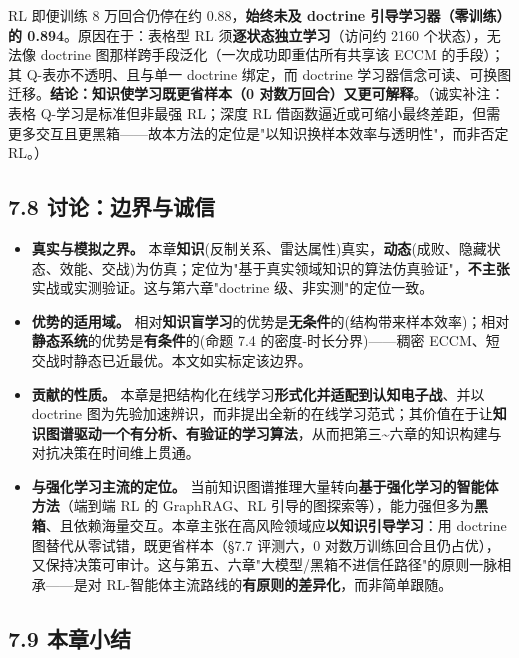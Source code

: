 \documentclass[12pt,a4paper]{ctexart}
\begin{document}
RL 即便训练 8 万回合仍停在约 0.88，\textbf{始终未及 doctrine 引导学习器（零训练）的 0.894}。原因在于：表格型 RL 须\textbf{逐状态独立学习}（访问约 2160 个状态），无法像 doctrine 图那样跨手段泛化（一次成功即重估所有共享该 ECCM 的手段）；其 Q-表亦不透明、且与单一 doctrine 绑定，而 doctrine 学习器信念可读、可换图迁移。\textbf{结论：知识使学习既更省样本（0 对数万回合）又更可解释}。（诚实补注：表格 Q-学习是标准但非最强 RL；深度 RL 借函数逼近或可缩小最终差距，但需更多交互且更黑箱——故本方法的定位是"以知识换样本效率与透明性"，而非否定 RL。）


\subsection*{7.8 讨论：边界与诚信}

\begin{itemize}[leftmargin=2em]
\item \textbf{真实与模拟之界。} 本章\textbf{知识}(反制关系、雷达属性)真实，\textbf{动态}(成败、隐藏状态、效能、交战)为仿真；定位为"基于真实领域知识的算法仿真验证"，\textbf{不主张}实战或实测验证。这与第六章"doctrine 级、非实测"的定位一致。
\item \textbf{优势的适用域。} 相对\textbf{知识盲学习}的优势是\textbf{无条件}的(结构带来样本效率)；相对\textbf{静态系统}的优势是\textbf{有条件}的(命题 7.4 的密度-时长分界)——稠密 ECCM、短交战时静态已近最优。本文如实标定该边界。
\item \textbf{贡献的性质。} 本章是把结构化在线学习\textbf{形式化并适配到认知电子战}、并以 doctrine 图为先验加速辨识，而非提出全新的在线学习范式；其价值在于让\textbf{知识图谱驱动一个有分析、有验证的学习算法}，从而把第三\textasciitilde{}六章的知识构建与对抗决策在时间维上贯通。
\item \textbf{与强化学习主流的定位。} 当前知识图谱推理大量转向\textbf{基于强化学习的智能体方法}（端到端 RL 的 GraphRAG、RL 引导的图探索等），能力强但多为\textbf{黑箱}、且依赖海量交互。本章主张在高风险领域应\textbf{以知识引导学习}：用 doctrine 图替代从零试错，既更省样本（§7.7 评测六，0 对数万训练回合且仍占优），又保持决策可审计。这与第五、六章"大模型/黑箱不进信任路径"的原则一脉相承——是对 RL-智能体主流路线的\textbf{有原则的差异化}，而非简单跟随。
\end{itemize}


\subsection*{7.9 本章小结}
\end{document}
